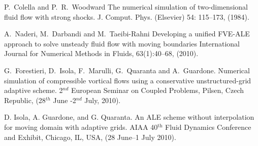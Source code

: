 
\begin{thebibliography}{10}

{\sc P.~Colella and P.~R.~Woodward}
{The numerical simulation of two-dimensional fluid flow with strong shocks}.
J. Comput. Phys. (Elsevier) 54: 115--173, (1984).
	
{\sc A.~Naderi, M.~Darbandi and M.~Taeibi-Rahni}
{Developing a unified FVE-ALE approach to solve unsteady fluid flow with moving boundaries}
{International Journal for Numerical Methods in Fluids, 63(1):40--68, (2010).}
	
{\sc G.~Forestieri, D.~Isola, F.~Marulli, G.~Quaranta and A.~Guardone}.
{Numerical simulation of compressible vortical flows using a conservative unstructured-grid adaptive scheme}.
2$^{nd}$ European Seminar on Coupled Problems, Pilsen, Czech Republic, (28$^{th}$ June -2$^{nd}$ July, 2010).
	
{\sc D. Isola, A. Guardone, and G. Quaranta.}
{An {ALE} scheme without interpolation for moving domain with adaptive grids}.
AIAA 40\ensuremath{^{\textrm{th}}} Fluid Dynamics Conference and Exhibit, Chicago, IL, USA, (28 June--1 July 2010).

\end{thebibliography}